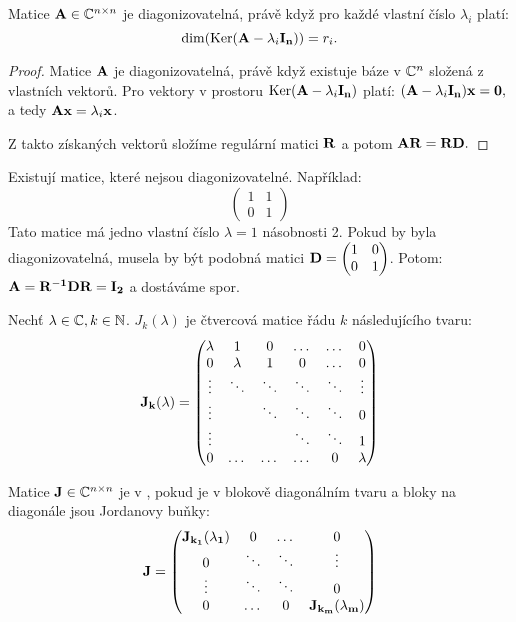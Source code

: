 \begin{proposition}
    Matice $\mathbf{A} \in \mathbb{C}^{n\times n}$ je diagonizovatelná, právě když pro každé vlastní 
    číslo $\lambda_i$ platí:
    $$\mathop{\mathrm{dim}}(\mathop{\mathrm{Ker}}(\mathbf{A} - \lambda_i\mathbf{I_{n}})) = r_i.$$
\end{proposition}

\begin{proof}
    Matice $\mathbf{A}$ je diagonizovatelná, právě když existuje báze v $\mathbb{C}^n$ složená
    z vlastních vektorů. Pro vektory v prostoru $\mathop{\mathrm{Ker}}(\mathbf{A} - \lambda_i\mathbf{I_{n}})$ 
    platí: $(\mathbf{A} - \lambda_i\mathbf{I_{n}})\mathbf{x} = \mathbf{0},$ a tedy $\mathbf{A}\mathbf{x} = \lambda_i\mathbf{x}$.

    Z takto získaných vektorů složíme regulární matici $\mathbf{R}$ a potom
     $\mathbf{A} \mathbf{R} = \mathbf{R} \mathbf{D}.$
\end{proof}

\begin{remark}
    Existují matice, které nejsou diagonizovatelné. Například:
    $$\begin{pmatrix}
        1 &1 \\
        0 &1
    \end{pmatrix}$$
    Tato matice má jedno vlastní číslo $\lambda = 1$ násobnosti 2. Pokud by 
    byla diagonizovatelná, musela by být podobná matici $\mathbf{D} = \begin{pmatrix}
        1 &0 \\
        0 &1
    \end{pmatrix}$. Potom: $\mathbf{A} = \mathbf{R^{-1}} \mathbf{D} \mathbf{R} = \mathbf{I_2}$ a dostáváme spor.
\end{remark}

\begin{definition}
    Nechť $\lambda \in \mathbb{C}, k \in \mathbb{N}$.  
    $J_k(\lambda)$ je čtvercová matice řádu $k$ následujícího tvaru:
    $$\mathbf{J_k(\lambda)} = \begin{pmatrix}
        \lambda &1       &0      &\dots  &\dots  &0 \\
              0 &\lambda &1      &0      &\dots  &0 \\
         \vdots &\ddots  &\ddots &\ddots &\ddots &\vdots \\
         \vdots &        &\ddots &\ddots &\ddots &0 \\
         \vdots &        &       &\ddots &\ddots &1 \\
              0 &\dots   &\dots  &\dots  &0      &\lambda
    \end{pmatrix}$$
\end{definition}

\begin{definition}
    Matice $\mathbf{J} \in \mathbb{C}^{n\times n}$ je v , pokud
    je v blokově diagonálním tvaru a bloky na diagonále jsou Jordanovy buňky:
    $$\mathbf{J} = \begin{pmatrix}
        \mathbf{J_{k_1}(\lambda_1)} &0 &\dots &0 \\
                              0 &\ddots &\ddots &\vdots \\
                         \vdots &\ddots &\ddots &0 \\
                              0 &\dots  &0      &\mathbf{J_{k_m}(\lambda_m)}
    \end{pmatrix}$$
\end{definition}


